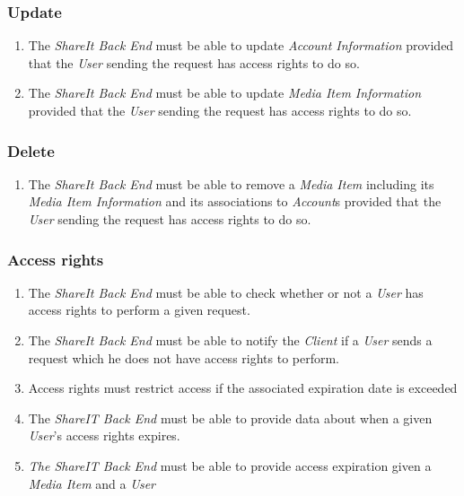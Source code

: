 \documentclass[../report.tex]{subfiles}
\begin{document}
\subsubsection{Update}
\begin{enumerate}[label=\textbf{FR-\twodigits*},resume]

\item The \textit{ShareIt Back End} must be able to update \textit{Account Information} provided that the \textit{User} sending the request has access rights to do so.

\item The \textit{ShareIt Back End} must be able to update \textit{Media Item Information} provided that the \textit{User} sending the request has access rights to do so.
\end{enumerate}

\subsubsection{Delete}
\begin{enumerate}[label=\textbf{FR-\twodigits*},resume]

\item The \textit{ShareIt Back End} must be able to remove a \textit{Media Item} including its \textit{Media Item Information} and its associations to \textit{Account}s provided that the \textit{User} sending the request has access rights to do so.

\end{enumerate}

\subsubsection{Access rights}
\begin{enumerate}[label=\textbf{FR-\twodigits*},resume]

\item The \textit{ShareIt Back End} must be able to check whether or not a \textit{User} has access rights to perform a given request.

\item The \textit{ShareIt Back End} must be able to notify the \textit{Client} if a \textit{User} sends a request which he does not have access rights to perform.

\item Access rights must restrict access if the associated expiration date is exceeded

\item The \textit{ShareIT Back End} must be able to provide data about when a given \textit{User}'s access rights expires.

\item \textit{The ShareIT Back End} must be able to provide access expiration given a \textit{Media Item} and a \textit{User}

\end{enumerate}
\end{document}

